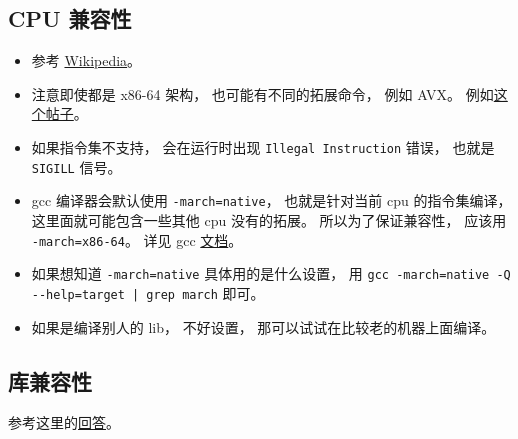
\begin{issues}
\issueDraft
\end{issues}


\subsection{CPU 兼容性}

\begin{itemize}
\item 参考 \href{https://en.wikipedia.org/wiki/Binary-code_compatibility}{Wikipedia}。
\item 注意即使都是 x86-64 架构， 也可能有不同的拓展命令， 例如 AVX。 例如\href{https://stackoverflow.com/questions/50945287/illegal-instruction-when-run-precompiled-program-on-other-machine}{这个帖子}。
\item 如果指令集不支持， 会在运行时出现 \verb|Illegal Instruction| 错误， 也就是 \verb|SIGILL| 信号。
\item gcc 编译器会默认使用 \verb|-march=native|， 也就是针对当前 cpu 的指令集编译， 这里面就可能包含一些其他 cpu 没有的拓展。 所以为了保证兼容性， 应该用 \verb|-march=x86-64|。 详见 gcc \href{https://gcc.gnu.org/onlinedocs/gcc/x86-Options.html}{文档}。
\item 如果想知道 \verb|-march=native| 具体用的是什么设置， 用 \verb`gcc -march=native -Q --help=target | grep march` 即可。
\item 如果是编译别人的 lib， 不好设置， 那可以试试在比较老的机器上面编译。
\end{itemize}

\subsection{库兼容性}
参考这里的\href{https://stackoverflow.com/questions/20183883/determining-binary-compatibility-under-linux}{回答}。


